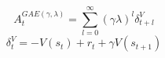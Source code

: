 $$A_t^{GAE(\gamma,\lambda)} = \sum_{l=0}^{\infty}(\gamma\lambda)^l\delta_{t+l}^V$$
$$\delta_t^V = -V(s_t) + r_t + \gamma V(s_{t+1})$$

